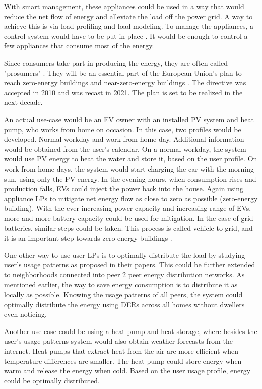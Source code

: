 With smart management, these appliances could be used in a way that would reduce the net flow of energy and alleviate the load off the power grid.
A way to achieve this is via load profiling and load modeling. 
To manage the appliances, a control system would have to be put in place \cite{DirectLoadControll2021}.
It would be enough to control a few appliances that consume most of the energy. 

Since consumers take part in producing the energy, they are often called "prosumers" \cite{Prosumer2016}.
They will be an essential part of the European Union's plan to reach zero-energy buildings
and near-zero-energy buildings \cite{eu2021}. The directive was accepted in 2010 and was recast in 2021.
The plan is set to be realized in the next decade.

An actual use-case would be an EV owner with an installed PV system and heat pump, who works from home on occasion.
In this case, two profiles would be developed. Normal workday and work-from-home day.
Additional information would be obtained from the user's calendar. 
On a normal workday, the system would use PV energy to heat the water and store it, based on the user profile.
On work-from-home days, the system would start charging the car with the morning sun, using only the PV energy. 
In the evening hours, when consumption rises and production falls, EVs could inject the power back into the house. 
Again using appliance LPs to mitigate net energy flow as close to zero as possible (zero-energy building).
With the ever-increasing power capacity and increasing range of EVs, more and more battery capacity could be used for mitigation. 
In the case of grid batteries, similar steps could be taken.
This process is called vehicle-to-grid, and it is an important step towards zero-energy buildings \cite{EV2018} \cite{EV2020}.

One other way to use user LPs is to optimally distribute the load by studying user's usage patterns as \cite{Chuan2014} \cite{shift2015} proposed in their papers. 
This could be further extended to neighborhoods connected into peer 2 peer energy distribution networks.
As mentioned earlier, the way to save energy consumption is to distribute it as locally as possible. 
Knowing the usage patterns of all peers, the system could optimally distribute the energy using DERs across all homes without dwellers even noticing.

Another use-case could be using a heat pump and heat storage,
where besides the user's usage patterns system would also obtain weather forecasts from the internet.
Heat pumps that extract heat from the air are more efficient when temperature differences are smaller. 
The heat pump could store energy when warm and release the energy when cold.
Based on the user usage profile, energy could be optimally distributed.

